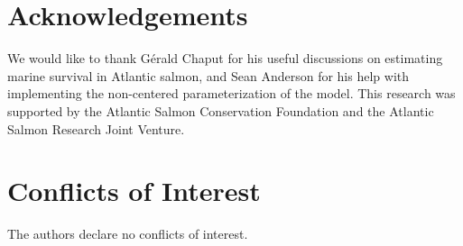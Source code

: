 \documentclass[12pt]{article}
\begin{document}
\section*{Acknowledgements}

We would like to thank G\'{e}rald Chaput for his useful discussions on
estimating marine survival in Atlantic salmon, and Sean Anderson for his help
with implementing the non-centered parameterization of the model.
This research was supported by the Atlantic Salmon Conservation Foundation and
the Atlantic Salmon Research Joint Venture.

\section*{Conflicts of Interest}

The authors declare no conflicts of interest.
 


%
\end{document}
